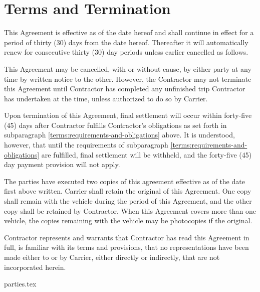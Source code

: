 \section{Terms and Termination}
{
    \setlength{\parskip}{\baselineskip}
    \setlength{\parindent}{0pt}

    This Agreement is effective as of the date hereof and shall continue in
    effect for a period of thirty (30) days from the date hereof.
    Thereafter it will automatically renew for consecutive thirty (30) day
    periods unless earlier cancelled as follows.

    This Agreement may be cancelled, with or without cause, by either party
    at any time by written notice to the other. However, the Contractor may
    not terminate this Agreement until Contractor has completed any
    unfinished trip Contractor has undertaken at the time, unless
    authorized to do so by Carrier.

    Upon termination of this Agreement, final settlement will occur within
    forty-five (45) days after Contractor fulfills Contractor's obligations
    as set forth in subparagraph
    \ref{terms:requirements-and-obligations} above. It is
    understood, however, that until the requirements of subparagraph
    \ref{terms:requirements-and-obligations} are fulfilled, final
    settlement will be withheld, and the forty-five (45) day payment
    provision will not apply.

    The parties have executed two copies of this agreement effective as of
    the date first above written. Carrier shall retain the original of this
    Agreement. One copy shall remain with the vehicle during the period of
    this Agreement, and the other copy shall be retained by Contractor.
    When this Agreement covers more than one vehicle, the copies remaining
    with the vehicle may be photocopies if the original.

    Contractor represents and warrants that Contractor has read this
    Agreement in full, is familiar with its terms and provisions, that no
    representations have been made either to or by Carrier, either directly
    or indirectly, that are not incorporated herein.
    
    {parties.tex}
}